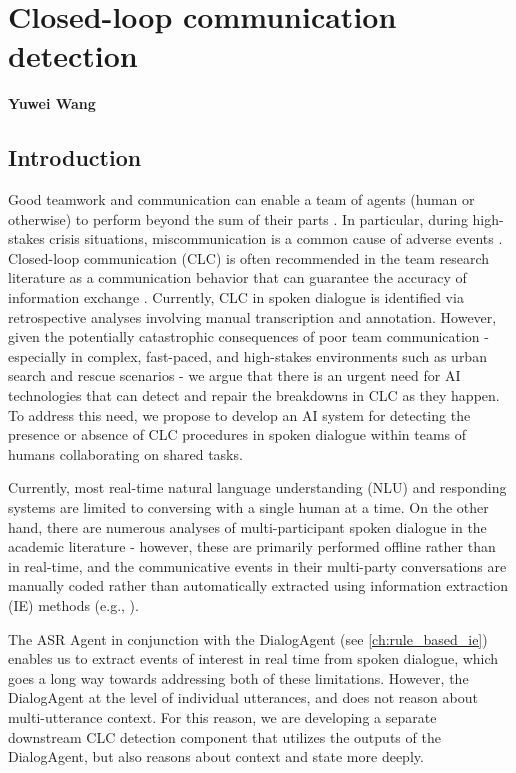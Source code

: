\chapter{Closed-loop communication detection}
\label{ch:clc}
\textbf{Yuwei Wang}

\section{Introduction}

Good teamwork and communication can enable a team of agents (human or
otherwise) to perform beyond the sum of their parts \citep{roberts2022state}.
In particular, during high-stakes crisis situations, miscommunication is a
common cause of adverse events
\citep{taylor2014description,davis2017operative}. Closed-loop communication
(CLC) is often recommended in the team research literature as a communication
behavior that can guarantee the accuracy of information exchange
\citep{marzuki2019closed}. Currently, CLC in spoken dialogue is identified via
retrospective analyses involving manual transcription and annotation. However,
given the potentially catastrophic consequences of poor team communication
\citep{flin2004identifying} - especially in complex, fast-paced, and
high-stakes environments such as urban search and rescue scenarios - we argue
that there is an urgent need for AI technologies that can detect and repair the
breakdowns in CLC as they happen. To address this need, we propose to develop
an AI system for detecting the presence or absence of CLC procedures in spoken
dialogue within teams of humans collaborating on shared tasks.

Currently, most real-time natural language understanding (NLU) and responding
systems are limited to conversing with a single human at a time. On the other
hand, there are numerous analyses of multi-participant spoken dialogue in the
academic literature - however, these are primarily performed offline rather
than in real-time, and the communicative events in their multi-party
conversations are manually coded rather than automatically extracted using
information extraction (IE) methods (e.g., \citep{jagannath2022speech}).

The ASR Agent in conjunction with the DialogAgent (see \autoref{ch:rule_based_ie})
enables us to extract events of interest in real time from spoken dialogue,
which goes a long way towards addressing both of these limitations. However,
the DialogAgent at the level of individual utterances, and does not reason
about multi-utterance context. For this reason, we are developing a separate downstream
CLC detection component that utilizes the outputs of the DialogAgent, but also
reasons about context and state more deeply.


